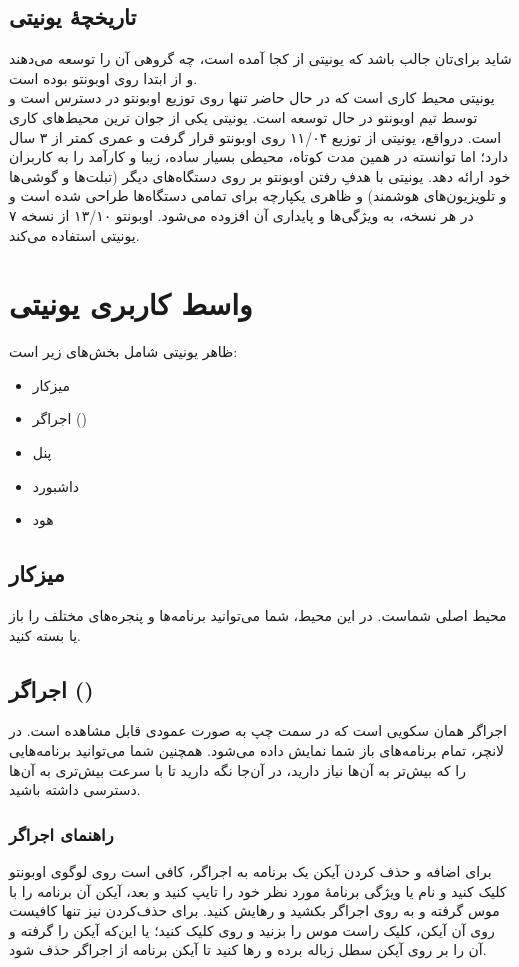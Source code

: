 \subsection{تاریخچهٔ یونیتی}
شاید برای‌تان جالب باشد که یونیتی از کجا آمده است، چه گروهی آن را توسعه می‌دهند و از ابتدا روی اوبونتو بوده است.\\
یونیتی محیط کاری است که در حال حاضر تنها روی توزیع اوبونتو در دسترس است و توسط تیم اوبونتو در حال توسعه است. یونیتی یکی از جوان ترین محیط‌های کاری است. در‌واقع، یونیتی از توزیع ۱۱/۰۴ روی اوبونتو قرار گرفت و عمری کمتر از ۳ سال دارد؛ اما توانسته در همین مدت کوتاه، محیطی بسیار ساده، زیبا و کارآمد را به کاربران خود ارائه دهد. یونیتی با هدفِ رفتن اوبونتو بر روی دستگاه‌های دیگر (تبلت‌ها و گوشی‌ها و تلویزیون‌های هوشمند) و ظاهری یکپارچه برای تمامی دستگاه‌ها طراحی شده است و در هر نسخه، به ویژگی‌ها و پایداری آن افزوده می‌شود. اوبونتو ۱۳/۱۰ از نسخه ۷ یونیتی استفاده می‌کند.
\section{واسط کاربری یونیتی}
ظاهر یونیتی شامل بخش‌های زیر است:
\begin{itemize}
\item میزکار
\item اجراگر ()
\item پنل
\item داشبورد
\item هود
\end{itemize}

\subsection{میزکار}
محیط اصلی شماست. در این محیط، شما می‌توانید برنامه‌ها و پنجره‌های مختلف را باز یا بسته کنید.
\subsection[اجراگر (Launcher)]{اجراگر ()}
اجراگر همان سکویی است که در سمت چپ به صورت عمودی قابل مشاهده است. در لانچر، تمام برنامه‌های باز شما نمایش داده می‌شود. همچنین شما می‌توانید برنامه‌هایی را که بیش‌تر به آن‌ها نیاز دارید، در آن‌جا نگه دارید تا با سرعت بیش‌تری به آن‌ها دسترسی داشته باشید.
\subsubsection{راهنمای اجراگر}
برای اضافه و حذف کردن آیکن یک برنامه به اجراگر، کافی است روی لوگوی اوبونتو کلیک کنید و نام یا ویژگی برنامهٔ مورد نظر خود را تایپ کنید و بعد، آیکن آن برنامه را با موس گرفته و به روی اجراگر بکشید و رهایش کنید. برای حذف‌کردن نیز تنها کافیست روی آن آیکن، کلیک راست موس را بزنید و روی  کلیک کنید؛ یا این‌که آیکن را گرفته و آن را بر روی آیکن سطل زباله برده و رها کنید تا آیکن برنامه از اجراگر حذف شود.
